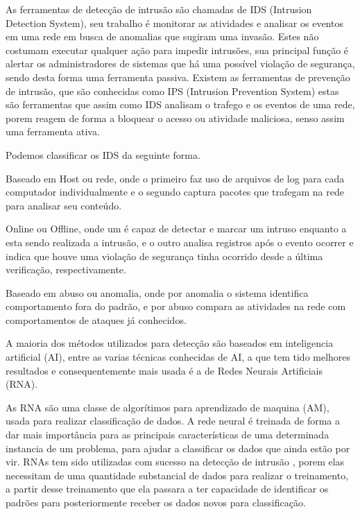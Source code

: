 As ferramentas de detecção de intrusão são chamadas de IDS (Intrusion Detection System), seu trabalho é monitorar as atividades e analisar os eventos em uma rede em busca de anomalias que sugiram uma invasão. Estes não costumam executar qualquer ação para impedir intrusões, sua principal função é alertar os administradores de sistemas que há uma possível violação de segurança, sendo desta forma uma ferramenta passiva.
Existem as ferramentas de prevenção de intrusão, que são conhecidas como IPS (Intrusion Prevention System) estas são ferramentas que assim como IDS analisam o trafego e os eventos de uma rede, porem reagem de forma a bloquear o acesso ou atividade maliciosa, senso assim uma ferramenta ativa.

Podemos classificar os IDS da seguinte forma.

Baseado em Host ou rede, onde o primeiro faz uso de arquivos de log para cada computador individualmente e o segundo captura pacotes que trafegam na rede para analisar seu conteúdo.

Online ou Offline, onde um é capaz de detectar e marcar um intruso enquanto a esta sendo realizada a intrusão, e o outro analisa registros após o evento ocorrer e indica que houve uma violação de segurança tinha ocorrido desde a última verificação, respectivamente.

Baseado em abuso ou anomalia, onde por anomalia o sistema identifica comportamento fora do padrão, e por abuso compara as atividades na rede com comportamentos de ataques já conhecidos.

A maioria dos métodos utilizados para detecção são baseados em inteligencia artificial (AI), entre as varias técnicas conhecidas de AI, a que tem tido melhores resultados e consequentemente mais usada é a de Redes Neurais Artificiais (RNA)\cite{Jake-Ryan}\cite{Stampar}.

As RNA são uma classe de algorítimos para aprendizado de maquina (AM), usada para realizar classificação de dados. A rede neural é treinada de forma a dar mais importância para as principais características de uma determinada instancia de um problema, para ajudar a classificar os dados que ainda estão por vir. 
RNAs tem sido utilizadas com sucesso na detecção de intrusão \cite{Zhang} \cite{Tong} \cite{Wonil}, porem elas necessitam de uma quantidade substancial de dados para realizar o treinamento, a partir desse treinamento que ela passara a ter capacidade de identificar os padrões para posteriormente receber os dados novos para classificação.




